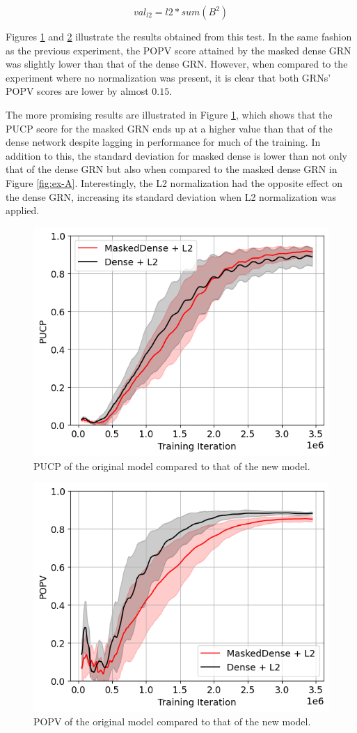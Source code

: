 \documentclass[twocolumn,a4paper,11pt]{article}
\begin{document}
    \begin{equation}
        val_{l2} = l2*sum(B^2)
        \label{eq:l2}
    \end{equation}

    Figures \ref{fig:ex-B} and \ref{fig:ex-B2} illustrate the results obtained from this test. In the same fashion as the previous experiment, the POPV score attained by the masked dense GRN was slightly lower than that of the dense GRN. However, when compared to the experiment where no normalization was present, it is clear that both GRNs' POPV scores are lower by almost $0.15$.
    
    The more promising results are illustrated in Figure \ref{fig:ex-B}, which shows that the PUCP score for the masked GRN ends up at a higher value than that of the dense network despite lagging in performance for much of the training. In addition to this, the standard deviation for masked dense is lower than not only that of the dense GRN but also when compared to the masked dense GRN in Figure \ref{fig:ex-A}. Interestingly, the L2 normalization had the opposite effect on the dense GRN, increasing its standard deviation when L2 normalization was applied.

    \begin{figure}[h]
        \centering
        \includegraphics[width=0.7\linewidth]{ex-img/final-l2-pucp.png}
        \caption{PUCP of the original model compared to that of the new model.} \label{fig:ex-B}
    \end{figure}

    \begin{figure}[h]
        \centering
        \includegraphics[width=0.7\linewidth]{ex-img/final-l2-popv.png}
        \caption{POPV of the original model compared to that of the new model.} \label{fig:ex-B2}
    \end{figure}
\end{document}
